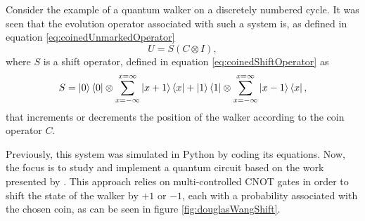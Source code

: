 \documentclass[../../dissertation.tex]{subfiles}
\begin{document}
Consider the example of a quantum walker on a discretely numbered cycle. It was
seen that the evolution operator associated with such a system is, as defined in equation \eqref{eq:coinedUnmarkedOperator}
\begin{equation}
	   U = S(C\otimes I), 
           \label{eq:coinedUnmarkedOperatorQiskit}
\end{equation}
where $S$ is a shift operator, defined in equation \eqref{eq:coinedShiftOperator}
as 
\begin{equation}
          S = \ket{0}\bra{0} \otimes \sum_{x=-\infty}^{x=\infty} \ket{x+1}\bra{x} + \ket{1}\bra{1}\otimes \sum_{x=-\infty}^{x=\infty} \ket{x-1}\bra{x},
	  \label{eq:shiftMatrixQiskit}
\end{equation} 
that increments or decrements the position of the walker according to the coin operator $C$.\par
Previously, this system was simulated in Python by coding its equations.  Now,
the focus is to study and implement a quantum circuit based on the work
presented by \cite{douglaswang07}. This approach relies on multi-controlled
CNOT gates in order to shift the state of the walker by $+1$ or $-1$, each with
a probability associated with the chosen coin, as can be seen in figure
\ref{fig:douglasWangShift}. 
\end{document}
